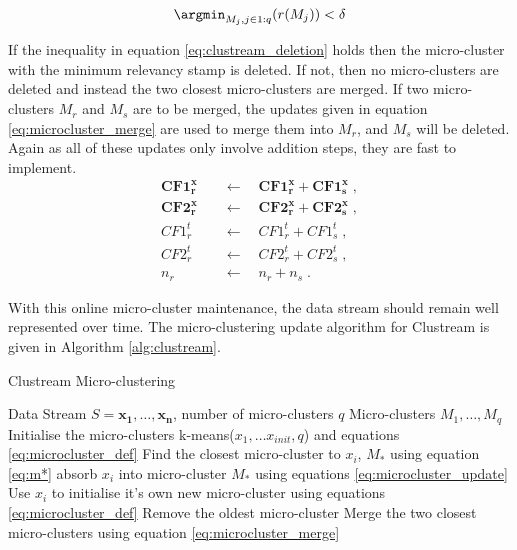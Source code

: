 \begin{equation}
  \label{eq:clustream_deletion}
 \argmin_{M_j , j \in 1:q}(r(M_j)) < \delta  
\end{equation}

 If the inequality in equation \eqref{eq:clustream_deletion} holds then the  micro-cluster with the minimum relevancy stamp is deleted. If not, then no micro-clusters are deleted and instead the two closest micro-clusters are merged. If two micro-clusters $M_r$ and $M_s$ are to be merged, the updates given in equation \eqref{eq:microcluster_merge} are used to merge them into $M_r$, and $M_s$ will be deleted. Again as all of these updates only involve addition steps, they are fast to implement. 
\begin{align}
\boldsymbol{CF1^x_r} \quad &\leftarrow \quad \boldsymbol{CF1^x_r} + \boldsymbol{CF1^x_s} \; , \nonumber  \\ 
\boldsymbol{CF2^x_r} \quad &\leftarrow \quad \boldsymbol{CF2^x_r} + \boldsymbol{CF2^x_s} \; , \nonumber\\
CF1^t_r \quad &\leftarrow \quad  CF1^t_r + CF1^t_s\; , \nonumber   \\
CF2^t_r \quad &\leftarrow \quad CF2^t_r +  CF2^t_s\; , \nonumber\\
n_r  \quad &\leftarrow \quad n_r + n_s \; .
\label{eq:microcluster_merge}
\end{align}

With this online micro-cluster maintenance, the data stream should remain well represented over time. The micro-clustering update algorithm for Clustream is given in Algorithm \ref{alg:clustream}.


\begin{algorithm}
\caption{Clustream Micro-clustering}  
\begin{algorithmic}
\REQUIRE Data Stream $S = {\boldsymbol{x_1},\ldots, \boldsymbol{x_n}  }$, number of micro-clusters $q$
\ENSURE Micro-clusters $M_1, \ldots, M_q$
\STATE Initialise the micro-clusters k-means($x_1, \hdots x_{init},q$) and equations \eqref{eq:microcluster_def}
 \STATE Find the closest micro-cluster to $x_i$, $M_*$ using equation \eqref{eq:m*}
   \STATE absorb $x_i$ into micro-cluster $M_*$ using equations \eqref{eq:microcluster_update}
 \ELSE
 \STATE Use $x_i$ to initialise it's own new micro-cluster using equations \eqref{eq:microcluster_def}
   \STATE Remove the oldest micro-cluster
  \ELSE 
   \STATE Merge the two closest micro-clusters using equation \eqref{eq:microcluster_merge}
  \ENDIF
\ENDIF
\ENDFOR
\end{algorithmic}
\label{alg:clustream}
\end{algorithm}
